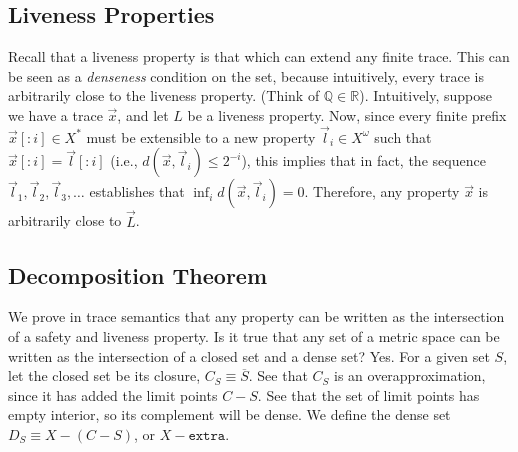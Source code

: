 \subsection{Liveness Properties}
Recall that a liveness property is that which can extend any finite trace.
This can be seen as a \emph{denseness} condition on the set, because intuitively, every trace is arbitrarily close to the liveness property. (Think of $\mathbb Q \in \mathbb R$).
Intuitively, suppose we have a trace $\vec x$, and let $L$ be a liveness property. Now, since every finite prefix $\vec x[:i] \in X^*$
must be extensible to a new property $\vec l_i \in X^\omega$ such that $\vec x[:i] = \vec l[:i]$ (i.e., $d(\vec x, \vec l_i) \leq 2^{-i}$), this implies that
in fact, the sequence $\vec l_1, \vec l_2, \vec l_3, \dots$ establishes that $\inf_i d(\vec x, \vec l_i) = 0$.
Therefore, any property $\vec x$ is arbitrarily close to $\vec L$.

\subsection{Decomposition Theorem}
We prove in trace semantics that any property can be written as the intersection of a safety and liveness property.
Is it true that any set of a metric space can be written as the intersection of a closed set and a dense set?
Yes.
For a given set $S$, let the closed set be its closure, $C_S \equiv \overline S$.
See that $C_S$ is an overapproximation, since it has added the limit points $C - S$. See that the set of limit points has empty interior,
so its complement will be dense. We define the dense set $D_S \equiv X - (C - S)$, or $X - \texttt{extra}$.
